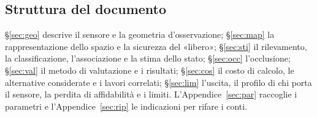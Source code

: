 \subsection{Struttura del documento}\label{sec:intro-struttura}

\S\ref{sec:geo} descrive il sensore e la geometria d'osservazione; \S\ref{sec:map} la rappresentazione dello spazio e la sicurezza del «libero»; \S\ref{sec:sti} il rilevamento, la classificazione, l'associazione e la stima dello stato; \S\ref{sec:occ} l'occlusione; \S\ref{sec:val} il metodo di valutazione e i risultati; \S\ref{sec:cos} il costo di calcolo, le alternative considerate e i lavori correlati; \S\ref{sec:lim} l'uscita, il profilo di chi porta il sensore, la perdita di affidabilità e i limiti. L'Appendice~\ref{sec:par} raccoglie i parametri e l'Appendice~\ref{sec:rip} le indicazioni per rifare i conti.
